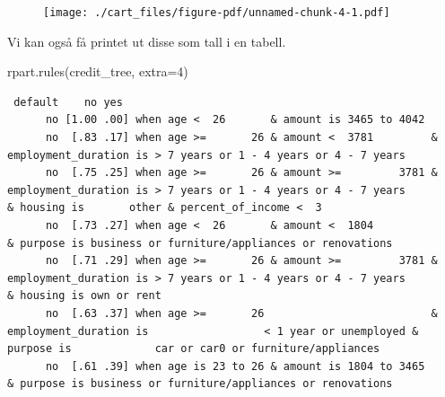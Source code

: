 \documentclass[
  letterpaper,
  DIV=11,
  numbers=noendperiod]{scrreprt}
\newenvironment{Shaded}{\begin{snugshade}}{\end{snugshade}}
\newcommand{\AttributeTok}[1]{\textcolor[rgb]{0.40,0.45,0.13}{#1}}
\newcommand{\DecValTok}[1]{\textcolor[rgb]{0.68,0.00,0.00}{#1}}
\newcommand{\FunctionTok}[1]{\textcolor[rgb]{0.28,0.35,0.67}{#1}}
\newcommand{\NormalTok}[1]{\textcolor[rgb]{0.00,0.23,0.31}{#1}}
\theoremstyle{definition}
\theoremstyle{remark}
\begin{document}
\begin{figure}[H]

{\centering \texttt{[image: ./cart\_files/figure-pdf/unnamed-chunk-4-1.pdf]}

}

\end{figure}

Vi kan også få printet ut disse som tall i en tabell.

\begin{Shaded}
\begin{Highlighting}[]
\FunctionTok{rpart.rules}\NormalTok{(credit\_tree, }\AttributeTok{extra=}\DecValTok{4}\NormalTok{)  }
\end{Highlighting}
\end{Shaded}

\begin{verbatim}
 default    no yes                                                                                                                                                                                                                               
      no [1.00 .00] when age <  26       & amount is 3465 to 4042                                                                                                                                                                                
      no  [.83 .17] when age >=       26 & amount <  3781         & employment_duration is > 7 years or 1 - 4 years or 4 - 7 years                                                                                                               
      no  [.75 .25] when age >=       26 & amount >=         3781 & employment_duration is > 7 years or 1 - 4 years or 4 - 7 years                                                              & housing is       other & percent_of_income <  3
      no  [.73 .27] when age <  26       & amount <  1804                                                                          & purpose is business or furniture/appliances or renovations                                                  
      no  [.71 .29] when age >=       26 & amount >=         3781 & employment_duration is > 7 years or 1 - 4 years or 4 - 7 years                                                              & housing is own or rent                         
      no  [.63 .37] when age >=       26                          & employment_duration is                  < 1 year or unemployed & purpose is             car or car0 or furniture/appliances                                                  
      no  [.61 .39] when age is 23 to 26 & amount is 1804 to 3465                                                                  & purpose is business or furniture/appliances or renovations                                                  

\end{verbatim}
\end{document}
